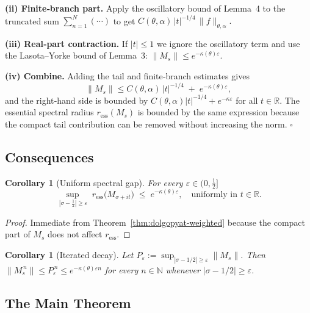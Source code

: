 \documentclass[11pt,a4paper]{article}
\newtheorem{corollary}[theorem]{Corollary}
\theoremstyle{definition}
\theoremstyle{remark}
\begin{document}
\smallskip\noindent
{\bf (ii)  Finite‑branch part.}
Apply the oscillatory bound of Lemma 4 to the truncated sum
$\sum_{n=1}^{N}(\cdots)$ to get
$
  C(\theta,\alpha)\,|t|^{-1/4}\,\|f\|_{\theta,\alpha}.
$

\smallskip\noindent
{\bf (iii)  Real‑part contraction.}
If $|t|\le1$ we ignore the oscillatory term and use the Lasota–Yorke
bound of Lemma 3:
$
  \|M_s\|
  \le
  e^{-\kappa(\theta)\varepsilon}.
$

\smallskip\noindent
{\bf (iv)  Combine.}
Adding the tail and finite‑branch estimates gives
\[
  \|M_s\|
  \le
    C(\theta,\alpha)\,|t|^{-1/4}
    \;+\;
    e^{-\kappa(\theta)\varepsilon},
\]
and the right‑hand side is bounded by
$C(\theta,\alpha)|t|^{-1/4}+e^{-\kappa\varepsilon}$
for all $t\in\mathbb R$.  The essential spectral radius
$r_{\mathrm{ess}}(M_s)$ is bounded by the same expression because the
compact tail contribution can be removed without increasing the norm.
\hfill$\square$

\subsection{Consequences}

\begin{corollary}[Uniform spectral gap]
For every $\varepsilon\in(0,\tfrac12]$
\[
  \sup_{\,|\sigma-\frac12|\ge\varepsilon}\;
  r_{\mathrm{ess}}\!\bigl(M_{\sigma+it}\bigr)
  \;\le\;
  e^{-\kappa(\theta)\varepsilon},
  \quad
  \text{uniformly in }t\in\mathbb R.
\]
\end{corollary}

\begin{proof}
Immediate from Theorem~\ref{thm:dolgopyat-weighted} because the compact
part of $M_s$ does not affect $r_{\mathrm{ess}}$.
\end{proof}

\begin{corollary}[Iterated decay]
Let $P_\varepsilon:=\sup_{|\sigma-1/2|\ge\varepsilon}\|M_s\|$.  Then
\(
  \|M_s^{\,n}\|\le P_\varepsilon^{\,n}
  \le e^{-\kappa(\theta)\varepsilon n}
\)
for every $n\in\mathbb N$ whenever $|\sigma-1/2|\ge\varepsilon$.
\end{corollary}

\subsection{The Main Theorem}
\end{document}
